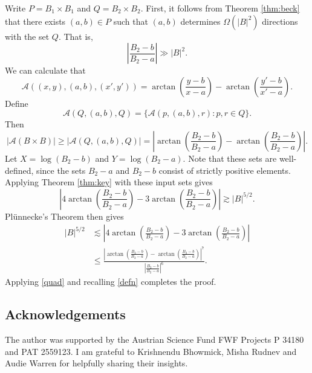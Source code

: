 \documentclass[11pt,oneside]{amsart}
\numberwithin{exercise}{subsection}
\begin{document}
Write $P= B_1 \times B_1$ and $Q=B_2 \times B_2$.  First, it follows from Theorem \ref{thm:beck} that there exists $(a,b) \in P$ such that $(a,b)$ determines $\Omega(|B|^2)$ directions with the set $Q$. That is,
\begin{equation} \label{quad}
\left | \frac{B_2-b}{B_2-a} \right | \gg |B|^2.
\end{equation}
We can calculate that
\[
\mathcal A( (x,y),(a,b), (x',y'))= \arctan\left ( \frac{y-b}{x-a} \right) - \arctan\left ( \frac{y'-b}{x'-a} \right).
\]
Define
\[
\mathcal A(Q,(a,b),Q)= \{ \mathcal A (p,(a,b),r) : p, r \in Q \}.
\]
Then
\begin{equation} \label{defn}
|\mathcal A(B \times B)| \geq |\mathcal A(Q,(a,b),Q)|= \left | \arctan\left ( \frac{B_2-b}{B_2-a} \right) - \arctan\left ( \frac{B_2-b}{B_2-a} \right) \right |.
\end{equation}
Let $X= \log (B_2-b)$ and $Y= \log(B_2-a)$. Note that these sets are well-defined, since the sets $B_2-a$ and $B_2-b$ consist of strictly positive elements. Applying Theorem \ref{thm:key} with these input sets gives
\[
 \left |4 \arctan\left ( \frac{B_2-b}{B_2-a} \right) - 3\arctan\left ( \frac{B_2-b}{B_2-a} \right) \right | \gtrsim |B|^{5/2}.
\]
Plünnecke's Theorem then gives
\begin{align*}
|B|^{5/2} &  \lesssim  \left |4 \arctan\left ( \frac{B_2-b}{B_2-a} \right) - 3\arctan\left ( \frac{B_2-b}{B_2-a} \right) \right |
\\& \leq \frac{ \left | \arctan\left ( \frac{B_2-b}{B_2-a} \right) -\arctan\left ( \frac{B_2-b}{B_2-a} \right) \right |^7}{ \left | \frac{B_2-b}{B_2-a} \right |^6}.
\end{align*}
Applying \eqref{quad} and recalling \eqref{defn} completes the proof.




\subsection*{Acknowledgements} The author was supported by the Austrian Science Fund FWF Projects P 34180 and PAT 2559123. I am grateful to Krishnendu Bhowmick, Misha Rudnev and Audie Warren for helpfully sharing their insights.
\end{document}
